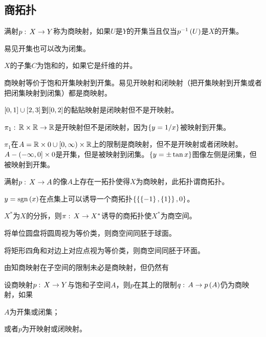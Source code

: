 \documentclass{ctexrep}
\begin{document}
  \subsection{商拓扑}
  \begin{definition}
    满射$p:\, X \rightarrow Y$称为商映射，如果$U$是$Y$的开集当且仅当$p^{-1}\left(U\right)$是$X$的开集。
  \end{definition}
  易见开集也可以改为闭集。
  \begin{definition}
    $X$的子集$C$为饱和的，如果它是纤维的并。
  \end{definition}
  商映射等价于饱和开集映射到开集。易见开映射和闭映射（把开集映射到开集或者把闭集映射到闭集）都是商映射。
  \begin{ex}
    $\left[0,1\right]\cup\left[2,3\right]$到$\left[0,2\right]$的黏贴映射是闭映射但不是开映射。
  \end{ex}
  \begin{ex}
    $\pi_1:\, \mathbb{R}\times\mathbb{R} \rightarrow \mathbb{R}$是开映射但不是闭映射，因为$\left\{y=1/x\right\}$被映射到开集。
  \end{ex}
  \begin{ex}
  \label{ex:qnotoc}
    $\pi_1$在$A=\mathbb{R}\times0 \cup \left[0,\infty\right) \times \mathbb{R}$上的限制是商映射，但不是开映射或者闭映射。$A-\left(-\infty,0\right]\times 0$是开集，但是被映射到闭集。$\left\{y=\pm\tan x\right\}$图像左侧是闭集，但被映射到开集。
  \end{ex}
  \begin{definition}
    满射$p:\, X \rightarrow A$的像$A$上存在一拓扑使得$X$为商映射，此拓扑谓商拓扑。
  \end{definition}
  \begin{ex}
    $y=\mathrm{sgn}\left(x\right)$在点集上可以诱导一个商拓扑$\left\{\left\{\left\{-1\right\},\left\{1\right\}\right\},0\right\}$。
  \end{ex}
  \begin{definition}
    $X^*$为$X$的分拆，则$\pi:\, X \rightarrow X^*$诱导的商拓扑使$X^*$为商空间。
  \end{definition}
  \begin{ex}
    将单位圆盘将圆周视为等价类，则商空间同胚于球面。
  \end{ex}
  \begin{ex}
    将矩形四角和对边上对应点视为等价类，则商空间同胚于环面。
  \end{ex}
  由知商映射在子空间的限制未必是商映射，但仍然有
  \begin{theorem}
    设商映射$p:\, X \rightarrow Y$与饱和子空间$A$，则$p$在其上的限制$q:\, A \rightarrow p\left(A\right)$仍为商映射，如果
    \begin{cenum}
      \item $A$为开集或闭集；
      \item 或者$p$为开映射或闭映射。
    \end{cenum}
  \end{theorem}
\end{document}
